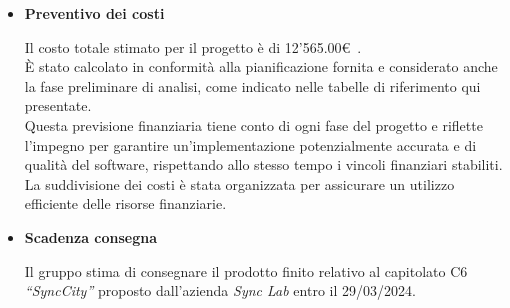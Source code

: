 \documentclass{article}
\begin{document}
\begin{itemize}
    \item[] \textbf{\fontsize{12}{6}\selectfont Preventivo dei costi} 

    Il costo totale stimato per il progetto è di 12'565.00\euro\ . \\ 
    È stato calcolato in conformità alla pianificazione fornita e considerato anche la fase preliminare di analisi, come indicato nelle tabelle di riferimento qui presentate. \\
    Questa previsione finanziaria tiene conto di ogni fase del progetto e riflette l’impegno per garantire un’implementazione potenzialmente accurata e di qualità del software, rispettando allo stesso tempo i vincoli finanziari stabiliti. La suddivisione dei costi è stata organizzata per assicurare un utilizzo efficiente delle risorse finanziarie.

    \vspace{0.5cm}

    \item[] \textbf{\fontsize{12}{6}\selectfont Scadenza consegna} 

    Il gruppo stima di consegnare il prodotto finito relativo al capitolato C6 \textit{“SyncCity”} proposto dall’azienda \textit{Sync Lab} entro il 29/03/2024.
\end{itemize}
\end{document}
